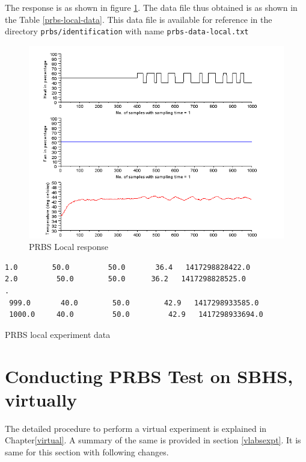 The response is as shown in figure \ref{prbs-test-local}. The data file thus obtained is as shown in the Table \ref{prbs-local-data}. This data file is available for reference in the directory {\tt prbs/identification} with name {\tt prbs-data-local.txt}


\begin{figure}
\centering
\includegraphics[width=0.7\linewidth]{prbs/prbs-local.png}
\caption{PRBS Local response}
\label{prbs-test-local}
\end{figure}

\begin{table}
\begin{verbatim}
1.0        50.0         50.0       36.4   1417298828422.0
2.0         50.0        50.0      36.2   1417298828525.0
.
 999.0       40.0        50.0        42.9   1417298933585.0
 1000.0     40.0         50.0         42.9   1417298933694.0
\end{verbatim}
\caption{PRBS local experiment data}
\label{prbs-local-data}
\end{table}

\section{Conducting PRBS Test on SBHS, virtually}
The detailed procedure to perform a virtual experiment is explained in Chapter\ref{virtual}. A summary of the same is provided in section \ref{vlabsexpt}. It is same for this section with following changes.

